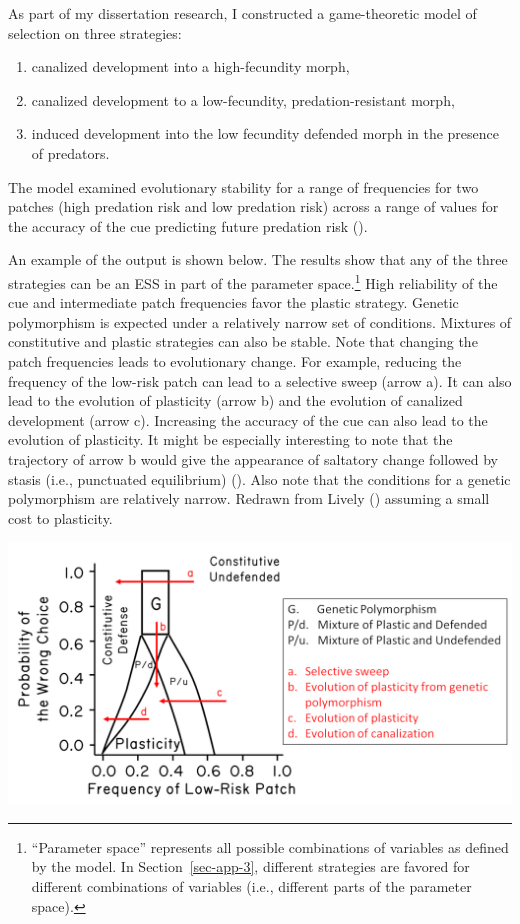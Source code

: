 \documentclass[
  letterpaper,
]{book}
\providecommand{\tightlist}{%
  \setlength{\itemsep}{0pt}\setlength{\parskip}{0pt}}\usepackage{longtable,booktabs,array}
\begin{document}
As part of my dissertation research, I constructed a game-theoretic
model of selection on three strategies:

\begin{enumerate}
\def\labelenumi{\arabic{enumi}.}
\tightlist
\item
  canalized development into a high-fecundity morph,
\item
  canalized development to a low-fecundity, predation-resistant morph,
\item
  induced development into the low fecundity defended morph in the
  presence of predators.
\end{enumerate}

The model examined evolutionary stability for a range of frequencies for
two patches (high predation risk and low predation risk) across a range
of values for the accuracy of the cue predicting future predation risk
().

An example of the output is shown below. The results show that any of
the three strategies can be an ESS in part of the parameter
space.\footnote{``Parameter space'' represents all possible combinations
  of variables as defined by the model. In Section~\ref{sec-app-3},
  different strategies are favored for different combinations of
  variables (i.e., different parts of the parameter space).} High
reliability of the cue and intermediate patch frequencies favor the
plastic strategy. Genetic polymorphism is expected under a relatively
narrow set of conditions. Mixtures of constitutive and plastic
strategies can also be stable. Note that changing the patch frequencies
leads to evolutionary change. For example, reducing the frequency of the
low-risk patch can lead to a selective sweep (arrow a). It can also lead
to the evolution of plasticity (arrow b) and the evolution of canalized
development (arrow c). Increasing the accuracy of the cue can also lead
to the evolution of plasticity. It might be especially interesting to
note that the trajectory of arrow b would give the appearance of
saltatory change followed by stasis (i.e., punctuated equilibrium)
(). Also note that the
conditions for a genetic polymorphism are relatively narrow. Redrawn
from Lively () assuming a small cost to
plasticity.

\includegraphics{images/fig3-7_hr.png}
\end{document}
